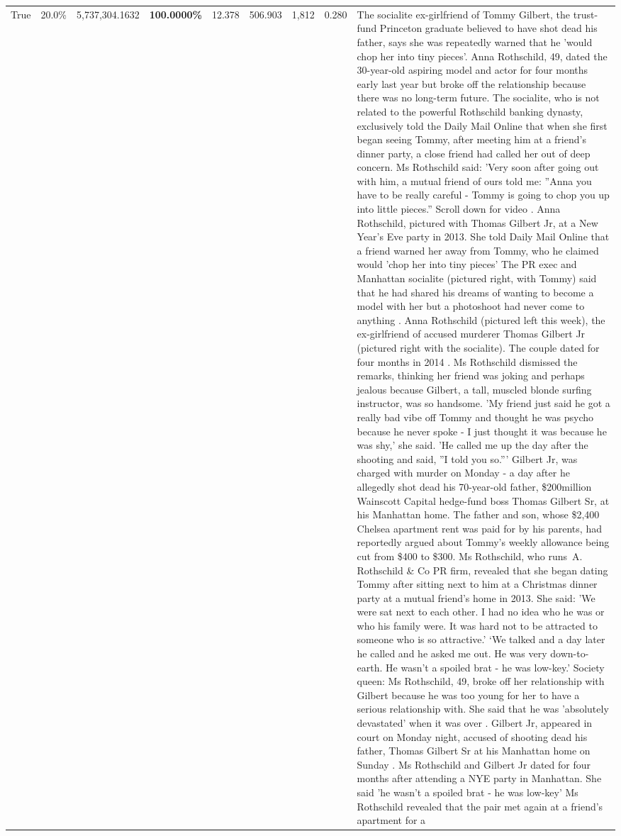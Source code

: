 \begin{table}[H]
\begin{tabular}{lllrlllll}
True & 20.0\% & 5,737,304.1632 & \bfseries \color{red} 100.0000\% & 12.378 & 506.903 & 1,812 & 0.280 & The socialite ex-girlfriend of Tommy Gilbert, the trust-fund Princeton graduate believed to have shot dead his father, says she was repeatedly warned that he 'would chop her into tiny pieces'. Anna Rothschild, 49, dated the 30-year-old aspiring model and actor for four months early last year but broke off the relationship because there was no long-term future. The socialite, who is not related to the powerful Rothschild banking dynasty, exclusively told the Daily Mail Online that when she first began seeing Tommy, after meeting him at a friend's dinner party, a close friend had called her out of deep concern. Ms Rothschild said: 'Very soon after going out with him, a mutual friend of ours told me: ''Anna you have to be really careful - Tommy is going to chop you up into little pieces.'' Scroll down for video . Anna Rothschild, pictured with Thomas Gilbert Jr, at a New Year's Eve party in 2013. She told Daily Mail Online that a friend warned her away from Tommy, who he claimed would 'chop her into tiny pieces' The PR exec and Manhattan socialite (pictured right, with Tommy) said that he had shared his dreams of wanting to become a model with her but a photoshoot had never come to anything . Anna Rothschild (pictured left this week), the ex-girlfriend of accused murderer Thomas Gilbert Jr (pictured right with the socialite). The couple dated for four months in 2014 . Ms Rothschild dismissed the remarks, thinking her friend was joking and perhaps jealous because Gilbert, a tall, muscled blonde surfing instructor, was so handsome. 'My friend just said he got a really bad vibe off Tommy and thought he was psycho because he never spoke - I just thought it was because he was shy,' she said. 'He called me up the day after the shooting and said, ''I told you so.''' Gilbert Jr, was charged with murder on Monday - a day after he allegedly shot dead his 70-year-old father, \$200million Wainscott Capital hedge-fund boss Thomas Gilbert Sr, at his Manhattan home. The father and son, whose \$2,400 Chelsea apartment rent was paid for by his parents, had reportedly argued about Tommy's weekly allowance being cut from \$400 to \$300. Ms Rothschild, who runs A. Rothschild \& Co PR firm, revealed that she began dating Tommy after sitting next to him at a Christmas dinner party at a mutual friend's home in 2013. She said: 'We were sat next to each other. I had no idea who he was or who his family were. It was hard not to be attracted to someone who is so attractive.' ‘We talked and a day later he called and he asked me out. He was very down-to-earth. He wasn’t a spoiled brat - he was low-key.’ Society queen: Ms Rothschild, 49, broke off her relationship with Gilbert because he was too young for her to have a serious relationship with. She said that he was 'absolutely devastated' when it was over . Gilbert Jr, appeared in court on Monday night, accused of shooting dead his father, Thomas Gilbert Sr at his Manhattan home on Sunday . Ms Rothschild and Gilbert Jr dated for four months after attending a NYE party in Manhattan. She said 'he wasn't a spoiled brat - he was low-key' Ms Rothschild revealed that the pair met again at a friend’s apartment for a 
\end{tabular}
\end{table}
